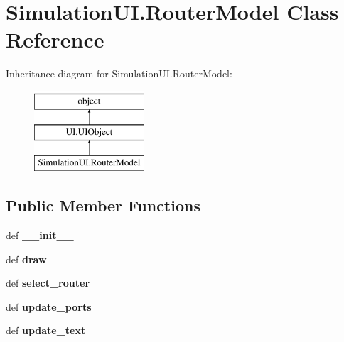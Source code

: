 \hypertarget{classSimulationUI_1_1RouterModel}{\section{Simulation\-U\-I.\-Router\-Model Class Reference}
\label{classSimulationUI_1_1RouterModel}
}
Inheritance diagram for Simulation\-U\-I.\-Router\-Model\-:\begin{figure}[H]
\begin{center}
\leavevmode
\includegraphics[height=3.000000cm]{classSimulationUI_1_1RouterModel}
\end{center}
\end{figure}
\subsection*{Public Member Functions}
\begin{DoxyCompactItemize}
\item 
\hypertarget{classSimulationUI_1_1RouterModel_a7ade1c08bc263097bafd0b045dbfdbb8}{def {\bfseries \-\_\-\-\_\-init\-\_\-\-\_\-}}\label{classSimulationUI_1_1RouterModel_a7ade1c08bc263097bafd0b045dbfdbb8}

\item 
\hypertarget{classSimulationUI_1_1RouterModel_a90ca97ae538f3baf4a3af5af42f4eb3d}{def {\bfseries draw}}\label{classSimulationUI_1_1RouterModel_a90ca97ae538f3baf4a3af5af42f4eb3d}

\item 
\hypertarget{classSimulationUI_1_1RouterModel_a79aa03f6b18ad414e182ff67d7195a24}{def {\bfseries select\-\_\-router}}\label{classSimulationUI_1_1RouterModel_a79aa03f6b18ad414e182ff67d7195a24}

\item 
\hypertarget{classSimulationUI_1_1RouterModel_a6fb15056edc3ff7c2ae96b701a1f0bd1}{def {\bfseries update\-\_\-ports}}\label{classSimulationUI_1_1RouterModel_a6fb15056edc3ff7c2ae96b701a1f0bd1}

\item 
\hypertarget{classSimulationUI_1_1RouterModel_aedb8ccdb852f603ed49c56f51e1b8793}{def {\bfseries update\-\_\-text}}\label{classSimulationUI_1_1RouterModel_aedb8ccdb852f603ed49c56f51e1b8793}

\end{DoxyCompactItemize}
